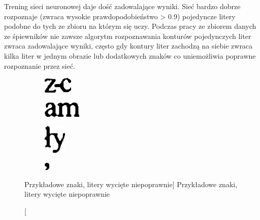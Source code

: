 \documentclass[a4paper,12pt]{article}
\begin{document}
             Trening sieci neuronowej daje dość zadowalające wyniki. Sieć bardzo dobrze rozpoznaje (zwraca wysokie prawdopodobieństwo > 0.9) pojedyncze litery podobne do tych ze zbioru na którym się uczy. Podczas pracy ze zbiorem danych ze śpiewników nie zawsze algorytm rozpoznawania konturów pojedynczych liter zwraca zadowalające wyniki, często gdy kontury liter zachodzą na siebie zwraca kilka liter w jednym obrazie lub dodatkowych znaków co uniemożliwia poprawne rozpoznanie przez sieć. 

            \begin{figure}[h!]
                \centering
                \begin{subfigure}[b]{2cm}
                    \includegraphics[frame]{image//practicalPart//w_letter_01.png}
                \caption{}
                \end{subfigure}
                \begin{subfigure}[b]{2cm}
                    \includegraphics[frame]{image//practicalPart//w_letter_02.png}
                \caption{}
                \end{subfigure}
              \newline
                \begin{subfigure}[b]{2cm}
                    \includegraphics[frame]{image//practicalPart//w_letter_03.png}
                \caption{}
                \end{subfigure}
                \begin{subfigure}[b]{2cm}
                    \includegraphics[frame]{image//practicalPart//w_letter_04.png}
                    \caption{}
                \end{subfigure}
                \caption
                    [Przykładowe znaki, litery wycięte niepoprawnie]
                    {Przykładowe znaki, litery wycięte niepoprawnie}
            \end{figure}
\end{document}
